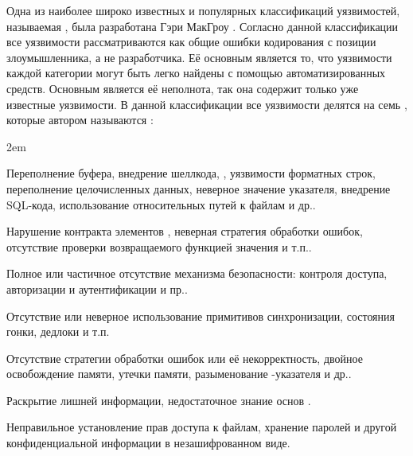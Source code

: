 %
Одна из наиболее широко известных и популярных классификаций уязвимостей, называемая , была разработана Гэри МакГроу   . 
%
Согласно данной классификации все уязвимости рассматриваются как общие ошибки кодирования с позиции злоумышленника, а не разработчика. 
%
Её основным  является то, что уязвимости каждой категории могут быть легко найдены с помощью автоматизированных средств. 
%
Основным  является её неполнота, так она содержит только уже известные уязвимости. 
%
В данной классификации все уязвимости делятся на семь , которые автором называются 
:  
\begin{description}
	\leftskip2em%
	\setlength{\itemsep}{0pt}%
	\setlength{\parsep}{0pt}%

	\item[Проверка входных данных и их представление.] Переполнение буфера, внедрение шеллкода, , уязвимости форматных строк, переполнение целочисленных данных, неверное значение указателя, внедрение SQL-кода, использование относительных путей к файлам и др..
	\item[Неправильное использование API.] Нарушение контракта элементов , неверная стратегия обработки ошибок, отсутствие проверки возвращаемого функцией значения и т.п..

	\item[Средства безопасности.] Полное или частичное отсутствие механизма безопасности: контроля доступа, авторизации и аутентификации и пр..

	\item[Время и состояние.] Отсутствие или неверное использование примитивов синхронизации, состояния гонки, дедлоки и т.п.
	
	\item[Ошибки.] Отсутствие стратегии обработки ошибок или её некорректность, двойное освобождение памяти, утечки памяти, разыменование -указателя и др..
	
	\item[Инкапсуляция.] Раскрытие лишней информации, недостаточное знание основ .
	
	\item[Программное окружение.] Неправильное установление прав доступа к файлам, хранение паролей и другой конфиденциальной информации в незашифрованном виде.
\end{description}

